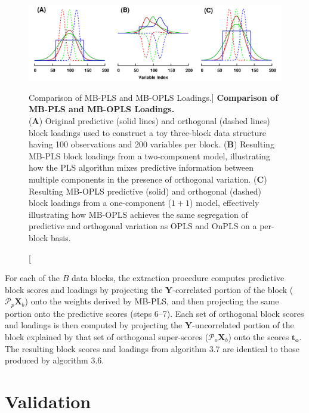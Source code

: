 \begin{figure}[ht!]
\includegraphics[width=6.5in]{figs/mva/14-mbopls.png}
\caption
      [Comparison of MB-PLS and MB-OPLS Loadings.]{
  {\bf Comparison of MB-PLS and MB-OPLS Loadings.}
  \\
  ({\bf A}) Original predictive (solid lines) and orthogonal (dashed lines)
  block loadings used to construct a toy three-block data structure having
  100 observations and 200 variables per block.
  ({\bf B}) Resulting MB-PLS block loadings from a two-component model,
  illustrating how the PLS algorithm mixes predictive information between
  multiple components in the presence of orthogonal variation.
  ({\bf C}) Resulting MB-OPLS predictive (solid) and orthogonal (dashed)
  block loadings from a one-component ($1+1$) model, effectively illustrating
  how MB-OPLS achieves the same segregation of predictive and orthogonal
  variation as OPLS and OnPLS on a per-block basis.
}
\end{figure}

\begin{doublespace}
For each of the $B$ data blocks, the extraction procedure computes predictive
block scores and loadings by projecting the $\mathbf{Y}$-correlated portion
of the block ($\mathcal{P}_p \mathbf{X}_b$) onto the weights derived by MB-PLS,
and then projecting the same portion onto the predictive scores (steps 6--7).
Each set of orthogonal block scores and loadings is then computed by projecting
the $\mathbf{Y}$-uncorrelated portion of the block explained by that set of
orthogonal super-scores ($\mathcal{P}_o \mathbf{X}_b$) onto the scores
$\mathbf{t_o}$. The resulting block scores and loadings from algorithm 3.7 are
identical to those produced by algorithm 3.6.
\end{doublespace}

\section{Validation}

